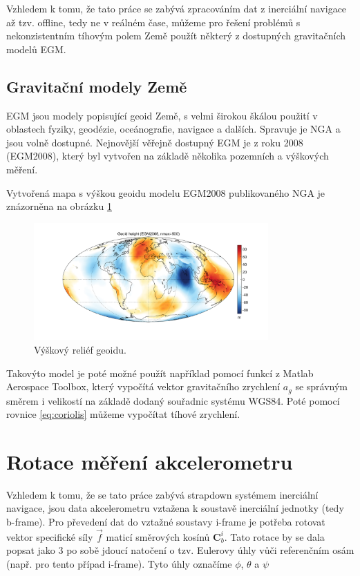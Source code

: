Vzhledem k tomu, že tato práce se zabývá zpracováním dat z inerciální navigace až tzv. offline, tedy ne v reálném čase, můžeme pro řešení problémů s nekonzistentním tíhovým polem Země použít některý z dostupných gravitačních modelů \ac{EGM}.

\subsection{Gravitační modely Země}
\ac{EGM} jsou modely popisující geoid Země, s velmi širokou škálou použití v oblastech fyziky, geodézie, oceánografie, navigace a dalších. Spravuje je \ac{NGA} a jsou volně dostupné. Nejnovější věřejně dostupný \ac{EGM} je z roku 2008 (EGM2008), který byl vytvořen na základě několika pozemních a výškových měření. \cite{Pavlis2012}

Vytvořená mapa s výškou geoidu modelu EGM2008 publikovaného \ac{NGA} je znázorněna na obrázku \ref{fig:EGM2008}

\begin{figure}[h] 
    \centering
    \includegraphics[width=0.8\textwidth]{obrazky/EGM2008}
    \caption{Výškový reliéf geoidu. \cite{Bezdek2013}}
    \label{fig:EGM2008}
\end{figure}

Takovýto model je poté možné použít například pomocí funkcí z Matlab Aerospace Toolbox, který vypočítá vektor gravitačního zrychlení $ a_{g} $ se správným směrem i velikostí na základě dodaný souřadnic systému WGS84. Poté pomocí rovnice \ref{eq:coriolis} můžeme vypočítat tíhové zrychlení.

\section{Rotace měření akcelerometru}
Vzhledem k tomu, že se tato práce zabývá strapdown systémem inerciální navigace, jsou data akcelerometru vztažena k soustavě inerciální jednotky (tedy b-frame). Pro převedení dat do vztažné soustavy i-frame je potřeba rotovat vektor specifické síly $ \vec{f} $ maticí směrových kosínů $ \mathbf{C}_{b}^{i} $. Tato rotace by se dala popsat jako 3 po sobě jdoucí natočení o tzv. Eulerovy úhly vůči referenčním osám (např. pro tento případ i-frame). Tyto úhly označíme $ \phi $, $ \theta $ a $ \psi $ \cite{Tittertonc2004}

